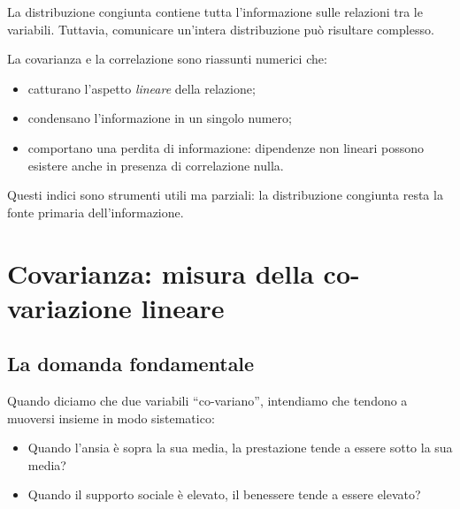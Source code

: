 \documentclass[
  italian,
  letterpaper,
  a4paper,
  11pt,
  open=any]{scrbook}
\providecommand{\tightlist}{%
  \setlength{\itemsep}{0pt}\setlength{\parskip}{0pt}}
\theoremstyle{plain}
\theoremstyle{definition}
\theoremstyle{definition}
\theoremstyle{remark}
\begin{document}
\begin{tcolorbox}[enhanced jigsaw, arc=.35mm, bottomrule=.15mm, bottomtitle=1mm, breakable, colback=white, colbacktitle=quarto-callout-important-color!10!white, colframe=quarto-callout-important-color-frame, coltitle=black, left=2mm, leftrule=.75mm, opacityback=0, opacitybacktitle=0.6, rightrule=.15mm, title=\textcolor{quarto-callout-important-color}{\faExclamation}\hspace{0.5em}{Dalla distribuzione congiunta ai riassunti numerici}, titlerule=0mm, toprule=.15mm, toptitle=1mm]

La distribuzione congiunta contiene tutta l'informazione sulle relazioni
tra le variabili. Tuttavia, comunicare un'intera distribuzione può
risultare complesso.

La covarianza e la correlazione sono riassunti numerici che:

\begin{itemize}
\tightlist
\item
  catturano l'aspetto \emph{lineare} della relazione;
\item
  condensano l'informazione in un singolo numero;
\item
  comportano una perdita di informazione: dipendenze non lineari possono
  esistere anche in presenza di correlazione nulla.
\end{itemize}

Questi indici sono strumenti utili ma parziali: la distribuzione
congiunta resta la fonte primaria dell'informazione.

\end{tcolorbox}

\section{Covarianza: misura della co-variazione
lineare}\label{sec-covariance}

\subsection{La domanda fondamentale}\label{la-domanda-fondamentale}

Quando diciamo che due variabili ``co-variano'', intendiamo che tendono
a muoversi insieme in modo sistematico:

\begin{itemize}
\tightlist
\item
  Quando l'ansia è sopra la sua media, la prestazione tende a essere
  sotto la sua media?
\item
  Quando il supporto sociale è elevato, il benessere tende a essere
  elevato?
\end{itemize}
\end{document}
